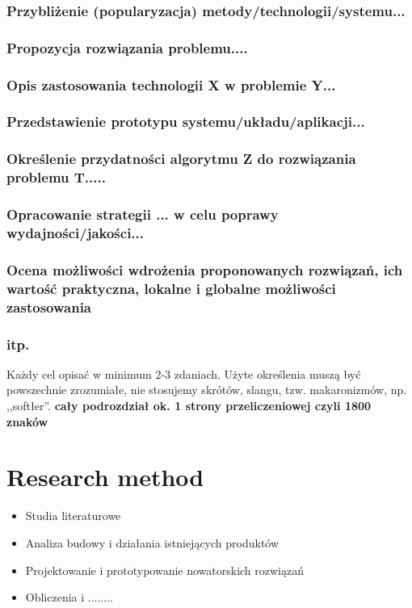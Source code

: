 \documentclass[12pt]{report}
\begin{document}
\subsubsection{Przybliżenie (popularyzacja) metody/technologii/systemu...}
\subsubsection{Propozycja rozwiązania problemu....}
\subsubsection{Opis zastosowania technologii X w problemie Y...}
\subsubsection{Przedstawienie prototypu systemu/układu/aplikacji...}
\subsubsection{Określenie przydatności algorytmu Z do rozwiązania problemu T.....
}
\subsubsection{Opracowanie strategii ... w celu poprawy wydajności/jakości...}
\subsubsection{Ocena możliwości wdrożenia proponowanych rozwiązań, ich wartość
praktyczna, lokalne i globalne możliwości zastosowania}
\subsubsection{itp.}

Każdy cel opisać w minimum 2-3 zdaniach. Użyte określenia muszą być powszechnie
zrozumiałe, nie stosujemy skrótów, slangu,  tzw. makaronizmów, np. ,,softłer''.
{\bf cały podrozdział ok. 1 strony przeliczeniowej czyli 1800 znaków}

\section{Research method}
\begin{itemize}
\item Studia literaturowe
\item Analiza budowy i działania istniejących produktów
\item Projektowanie i prototypowanie nowatorskich rozwiązań 
\item Obliczenia i ........
\end{itemize}
\end{document}

